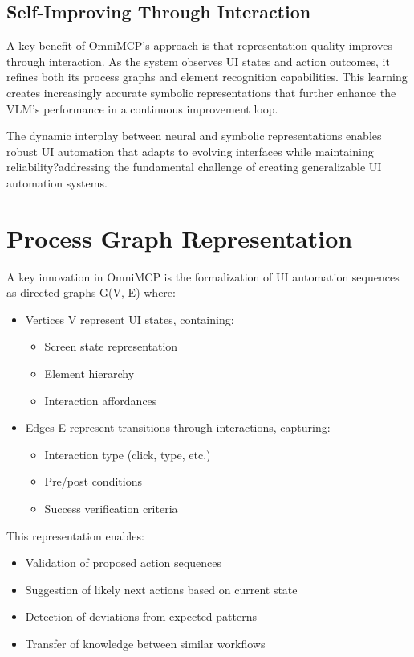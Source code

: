 \documentclass{article}
\begin{document}
\subsection{Self-Improving Through Interaction}

A key benefit of OmniMCP's approach is that representation quality improves through interaction. As the system observes UI states and action outcomes, it refines both its process graphs and element recognition capabilities. This learning creates increasingly accurate symbolic representations that further enhance the VLM's performance in a continuous improvement loop.

The dynamic interplay between neural and symbolic representations enables robust UI automation that adapts to evolving interfaces while maintaining reliability?addressing the fundamental challenge of creating generalizable UI automation systems.

\section{Process Graph Representation}

A key innovation in OmniMCP is the formalization of UI automation sequences as directed graphs G(V, E) where:

\begin{itemize}
    \item Vertices V represent UI states, containing:
    \begin{itemize}
        \item Screen state representation
        \item Element hierarchy
        \item Interaction affordances
    \end{itemize}
    \item Edges E represent transitions through interactions, capturing:
    \begin{itemize}
        \item Interaction type (click, type, etc.)
        \item Pre/post conditions
        \item Success verification criteria
    \end{itemize}
\end{itemize}

This representation enables:
\begin{itemize}
    \item Validation of proposed action sequences
    \item Suggestion of likely next actions based on current state
    \item Detection of deviations from expected patterns
    \item Transfer of knowledge between similar workflows
\end{itemize}
\end{document}
